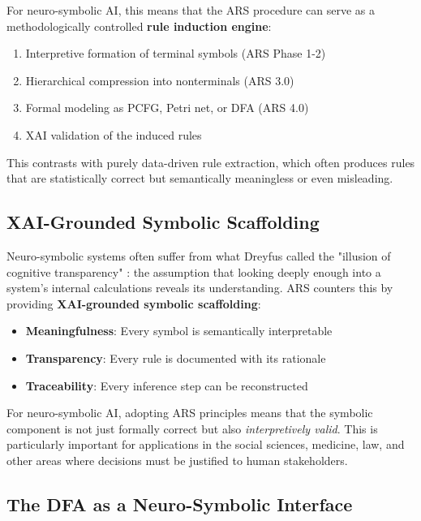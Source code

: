 \documentclass[12pt,a4paper]{article}
\begin{document}
For neuro-symbolic AI, this means that the ARS procedure can serve as a 
methodologically controlled \textbf{rule induction engine}:

\begin{enumerate}
    \item Interpretive formation of terminal symbols (ARS Phase 1-2)
    \item Hierarchical compression into nonterminals (ARS 3.0)
    \item Formal modeling as PCFG, Petri net, or DFA (ARS 4.0)
    \item XAI validation of the induced rules
\end{enumerate}

This contrasts with purely data-driven rule extraction, which often produces 
rules that are statistically correct but semantically meaningless or even 
misleading.

\subsection{XAI-Grounded Symbolic Scaffolding}

Neuro-symbolic systems often suffer from what Dreyfus called the "illusion of 
cognitive transparency" \citep{dreyfus1972what}: the assumption that looking 
deeply enough into a system's internal calculations reveals its understanding. 
ARS counters this by providing \textbf{XAI-grounded symbolic scaffolding}:

\begin{itemize}
    \item \textbf{Meaningfulness}: Every symbol is semantically interpretable
    \item \textbf{Transparency}: Every rule is documented with its rationale
    \item \textbf{Traceability}: Every inference step can be reconstructed
\end{itemize}

For neuro-symbolic AI, adopting ARS principles means that the symbolic component 
is not just formally correct but also \textit{interpretively valid}. This is 
particularly important for applications in the social sciences, medicine, law, 
and other areas where decisions must be justified to human stakeholders.

\subsection{The DFA as a Neuro-Symbolic Interface}
\end{document}
